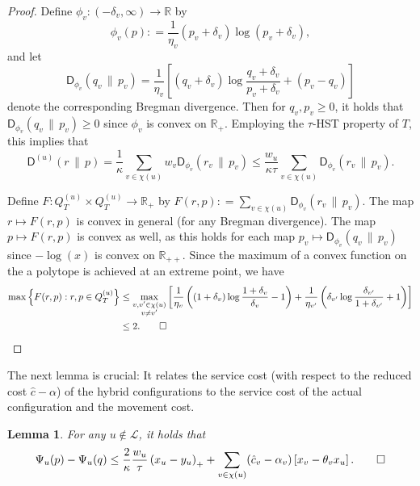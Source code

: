 \documentclass[11pt]{article}
\numberwithin{equation}{section}
\newtheorem{lemma}[theorem]{Lemma}
\theoremstyle{definition}
\theoremstyle{plain}
\newcommand{\R}{\mathbb R}
\newcommand{\calL}{\mathcal L}
\newcommand{\dmid}{\,\|\,}
\newcommand{\seteq}{\mathrel{\mathop:}=}
\newcommand{\sfD}{\mathsf D}
\begin{document}
\begin{proof}
	Define $\phi_v : (-\delta_v,\infty) \to \R$ by
	\[
	\phi_v(p) \seteq \frac{1}{\eta_v} (p_v+\delta_v) \log (p_v+\delta_v),
	\]
	and let
	\[
	\sfD_{\phi_v}(q_v \dmid p_v) = \frac{1}{\eta_v} \left[(q_v+\delta_v) \log \frac{q_v+\delta_v}{p_v+\delta_v} + (p_v-q_v)\right]
	\]
	denote the corresponding Bregman divergence.
	Then for $q_v,p_v \geq 0$, it holds that $\sfD_{\phi_v}(q_v \dmid p_v) \geq 0$ since $\phi_v$ is convex on $\R_+$.
	Employing the $\tau$-HST property of $T$, this implies that
	\[
	\sfD^{(u)}(r \dmid p) = \frac{1}{\kappa} \sum_{v \in \chi(u)} w_v \sfD_{\phi_v}(r_v \dmid p_v) \leq
	\frac{w_u}{\kappa \tau} \sum_{v \in \chi(u)} \sfD_{\phi_v}(r_v \dmid p_v).
	\]
	
	Define $F : Q^{(u)}_T \times Q^{(u)}_T \to \R_+$ by $F(r,p) \seteq\sum_{v \in \chi(u)} \sfD_{\phi_v}(r_v \dmid p_v)$.
	The map $r \mapsto F(r,p)$ is convex in general (for any Bregman divergence).
	The map $p \mapsto F(r,p)$ is convex as well, as this holds for each map $p_v \mapsto \sfD_{\phi_v}(q_v \dmid p_v)$
	since $-\log(x)$ is convex on $\R_{++}$.
	Since the maximum of a convex function on the a polytope is achieved at an extreme point, we have
	\begin{align*}
	\max \left\{ F(r,p) :r,p \in Q^{(u)}_T \right\} &\leq \max_{\substack{v,v' \in \chi(u) \\ v \neq v'}} 
	\left[
	\frac{1}{\eta_v} \left((1+\delta_v) \log \frac{1+\delta_v}{\delta_v} -1\right)
	+ \frac{1}{\eta_{v'}} \left(\delta_{v'} \log \frac{\delta_{v'}}{1+\delta_{v'}} +1\right)\right]
	\\
	&\leq 2.\qedhere
	\end{align*}
\end{proof}

The next lemma is crucial: It relates the service cost (with respect to the reduced cost $\hat{c}-\alpha$) of the hybrid configurations to the service cost of the actual configuration and the movement cost.
\begin{lemma}
   \label{lem:crucial}
	For any $u \notin \calL$, it holds that
	\begin{equation}\label{eq:hybrid}
	\Psi_u(p) - \Psi_u(q) \leq \frac{2}{\kappa} \frac{w_u}{\tau} \left(x_u-y_u\right)_+ + 
	\sum_{v \in \chi(u)} (\hat{c}_v-\alpha_v) \left[x_v - \theta_v x_u\right].\qedhere
	\end{equation}
\end{lemma}
\end{document}
